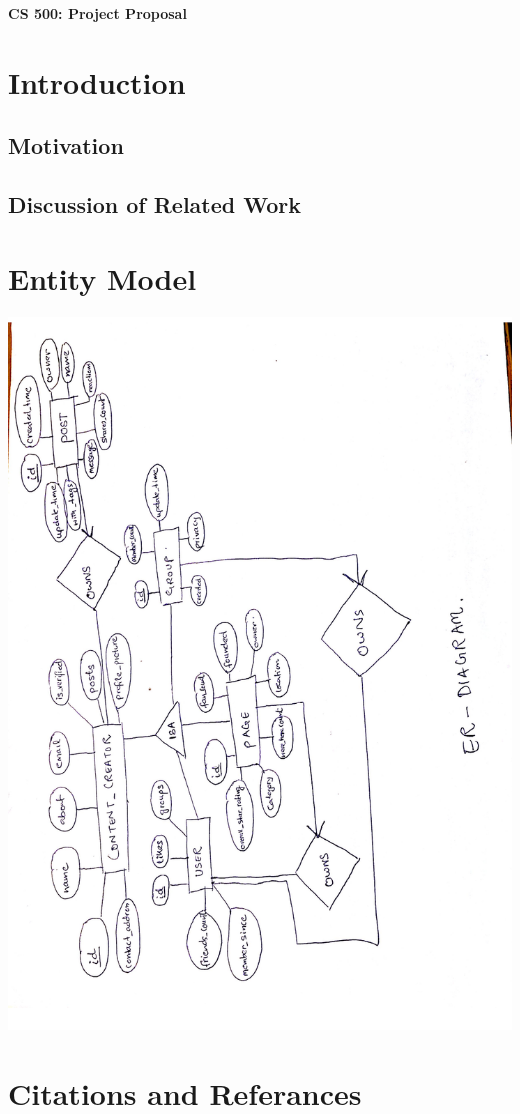 \documentclass{article}
\begin{document}
\begin{center}
\begin{LARGE}{\bf CS 500: Project Proposal} \end{LARGE}
\end{center}

\section{Introduction}

\subsection{Motivation}


\subsection{Discussion of Related Work}


\section{Entity Model}


\includegraphics{ER}


\section{Citations and Referances}
\end{document}

